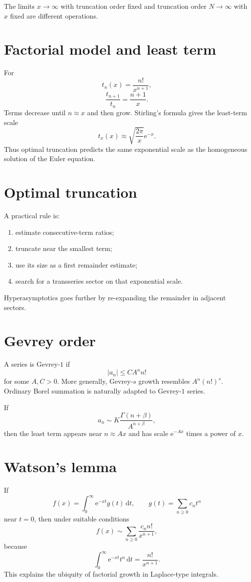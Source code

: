 \documentclass[11pt,oneside,openany]{book}
\newcommand{\e}{\mathrm{e}}
\newcommand{\dd}{\,\mathrm{d}}
\theoremstyle{plain}
\theoremstyle{definition}
\theoremstyle{remark}
\begin{document}
\begin{warningbox}
The limits $x\to\infty$ with truncation order fixed and truncation order $N\to\infty$ with $x$ fixed are different operations.
\end{warningbox}

\section{Factorial model and least term}
For
\[
  t_n(x)=\frac{n!}{x^{n+1}},
\]
\[
  \frac{t_{n+1}}{t_n}=\frac{n+1}{x}.
\]
Terms decrease until $n\approx x$ and then grow. Stirling's formula gives the least-term scale
\[
  t_x(x)\approx\sqrt{\frac{2\pi}{x}}\e^{-x}.
\]
Thus optimal truncation predicts the same exponential scale as the homogeneous solution of the Euler equation.

\section{Optimal truncation}
A practical rule is:
\begin{enumerate}
  \item estimate consecutive-term ratios;
  \item truncate near the smallest term;
  \item use its size as a first remainder estimate;
  \item search for a transseries sector on that exponential scale.
\end{enumerate}
Hyperasymptotics goes further by re-expanding the remainder in adjacent sectors.

\section{Gevrey order}
A series is Gevrey-$1$ if
\[
  |a_n|\le CA^nn!
\]
for some $A,C>0$. More generally, Gevrey-$s$ growth resembles $A^n(n!)^s$. Ordinary Borel summation is naturally adapted to Gevrey-$1$ series.

If
\[
  a_n\sim K\frac{\Gamma(n+\beta)}{A^{n+\beta}},
\]
then the least term appears near $n\approx Ax$ and has scale $\e^{-Ax}$ times a power of $x$.

\section{Watson's lemma}
If
\[
  f(x)=\int_0^\infty\e^{-xt}g(t)\dd t,
  \qquad g(t)=\sum_{n\ge0}c_nt^n
\]
near $t=0$, then under suitable conditions
\[
  f(x)\sim\sum_{n\ge0}\frac{c_nn!}{x^{n+1}},
\]
because
\[
  \int_0^\infty\e^{-xt}t^n\dd t=\frac{n!}{x^{n+1}}.
\]
This explains the ubiquity of factorial growth in Laplace-type integrals.
\end{document}
